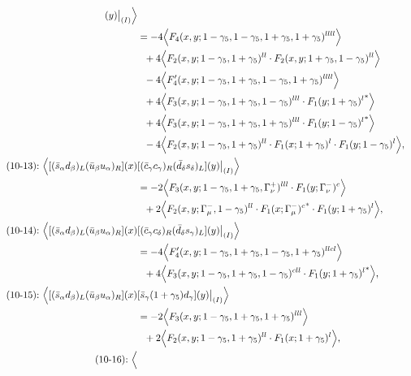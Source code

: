 \begin{align}
[(\bar s_\gamma s_\delta)_R(\bar d_\delta s_\gamma)_L](y)\big|_{(I)}
\Big\rangle
\notag\\*
&=
-4\Big\langle F_4(x,y;1-\gamma_5,1-\gamma_5,1+\gamma_5,1+\gamma_5)^{llll}\Big\rangle
\notag\\*&\ \ 
 + 4\Big\langle F_2(x,y;1-\gamma_5,1+\gamma_5)^{ll} \cdot F_2(x,y;1+\gamma_5,1-\gamma_5)^{ll}\Big\rangle
\notag\\*&\ \ 
-4\Big\langle F_4'(x,y;1-\gamma_5,1+\gamma_5,1-\gamma_5,1+\gamma_5)^{llll}\Big\rangle
\notag\\*&\ \ 
 + 4\Big\langle F_3(x,y;1-\gamma_5,1+\gamma_5,1-\gamma_5)^{lll} \cdot {F_1(y;1+\gamma_5)^l}^*\Big\rangle
\notag\\*&\ \ 
 + 4\Big\langle F_3(x,y;1-\gamma_5,1+\gamma_5,1+\gamma_5)^{lll} \cdot {F_1(y;1-\gamma_5)^l}^*\Big\rangle
\notag\\*&\ \ 
-4\Big\langle F_2(x,y;1-\gamma_5,1+\gamma_5)^{ll} \cdot F_1(x;1+\gamma_5)^l \cdot F_1(y;1-\gamma_5)^l\Big\rangle,
\\
\mbox{(10-13):}\ 
\Big\langle
[(\bar s_\alpha d_\beta)_L(\bar u_\beta u_\alpha)_R](x)&
[(\bar c_\gamma c_\gamma)_R(\bar d_\delta s_\delta)_L](y)\big|_{(I)}
\Big\rangle
\notag\\*
&=
-2\Big\langle F_3(x,y;1-\gamma_5,1+\gamma_5,\Gamma_\nu^+)^{lll} \cdot F_1(y;\Gamma_\nu^-)^c\Big\rangle
\notag\\*&\ \ 
 + 2\Big\langle F_2(x,y;\Gamma_\mu^-,1-\gamma_5)^{ll} \cdot {F_1(x;\Gamma_\mu^-)^c}^* \cdot F_1(y;1+\gamma_5)^l\Big\rangle,
\\
\mbox{(10-14):}\ 
\Big\langle
[(\bar s_\alpha d_\beta)_L(\bar u_\beta u_\alpha)_R](x)&
[(\bar c_\gamma c_\delta)_R(\bar d_\delta s_\gamma)_L](y)\big|_{(I)}
\Big\rangle
\notag\\*
&=
-4\Big\langle F_4'(x,y;1-\gamma_5,1+\gamma_5,1-\gamma_5,1+\gamma_5)^{llcl}\Big\rangle
\notag\\*&\ \ 
 + 4\Big\langle F_3(x,y;1-\gamma_5,1+\gamma_5,1-\gamma_5)^{cll} \cdot {F_1(y;1+\gamma_5)^l}^*\Big\rangle,
\\
\mbox{(10-15):}\ 
\Big\langle
[(\bar s_\alpha d_\beta)_L(\bar u_\beta u_\alpha)_R](x)&
[\bar s_\gamma (1 + \gamma_5) d_\gamma](y)\big|_{(I)}
\Big\rangle
\notag\\*
&=
-2\Big\langle F_3(x,y;1-\gamma_5,1+\gamma_5,1+\gamma_5)^{lll}\Big\rangle
\notag\\*&\ \ 
 + 2\Big\langle F_2(x,y;1-\gamma_5,1+\gamma_5)^{ll} \cdot F_1(x;1+\gamma_5)^l\Big\rangle,
\\
\mbox{(10-16):}\ 
\Big\langle

\end{align}
